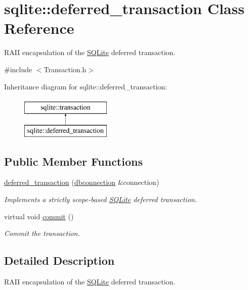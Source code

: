 \hypertarget{a00005}{\section{sqlite\-:\-:deferred\-\_\-transaction Class Reference}
\label{a00005}
}


R\-A\-I\-I encapsulation of the \hyperlink{a00038}{S\-Q\-Lite} deferred transaction.  




{\ttfamily \#include $<$Transaction.\-h$>$}

Inheritance diagram for sqlite\-:\-:deferred\-\_\-transaction\-:\begin{figure}[H]
\begin{center}
\leavevmode
\includegraphics[height=2.000000cm]{a00005}
\end{center}
\end{figure}
\subsection*{Public Member Functions}
\begin{DoxyCompactItemize}
\item 
\hyperlink{a00005_a18666e756f66c6978bf435cf6b072be7}{deferred\-\_\-transaction} (\hyperlink{a00004}{dbconnection} \&connection)
\begin{DoxyCompactList}\small\item\em Implements a strictly scope-\/based \hyperlink{a00038}{S\-Q\-Lite} deferred transaction. \end{DoxyCompactList}\item 
\hypertarget{a00014_abe219dd0bf949d569381f9830c7b2d1a}{virtual void \hyperlink{a00014_abe219dd0bf949d569381f9830c7b2d1a}{commit} ()}\label{a00014_abe219dd0bf949d569381f9830c7b2d1a}

\begin{DoxyCompactList}\small\item\em Commit the transaction. \end{DoxyCompactList}\end{DoxyCompactItemize}


\subsection{Detailed Description}
R\-A\-I\-I encapsulation of the \hyperlink{a00038}{S\-Q\-Lite} deferred transaction. 

